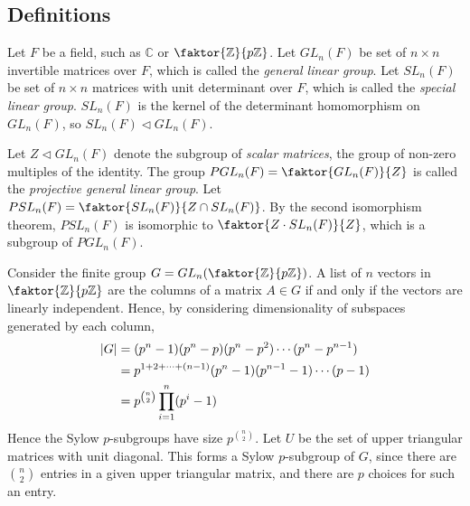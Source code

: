 \subsection{Definitions}
\begin{definition}
	Let \( F \) be a field, such as \( \mathbb C \) or \( \faktor{\mathbb Z}{p \mathbb Z} \).
	Let \( GL_n(F) \) be set of \( n \times n \) invertible matrices over \( F \), which is called the \textit{general linear group}.
	Let \( SL_n(F) \) be set of \( n \times n \) matrices with unit determinant over \( F \), which is called the \textit{special linear group}.
	\( SL_n(F) \) is the kernel of the determinant homomorphism on \( GL_n(F) \), so \( SL_n(F) \triangleleft GL_n(F) \).

	Let \( Z \triangleleft GL_n(F) \) denote the subgroup of \textit{scalar matrices}, the group of non-zero multiples of the identity.
	The group \( PGL_n(F) = \faktor{GL_n(F)}{Z} \) is called the \textit{projective general linear group}.
	Let \( PSL_n(F) = \faktor{SL_n(F)}{Z \cap SL_n(F)} \).
	By the second isomorphism theorem, \( PSL_n(F) \) is isomorphic to \( \faktor{Z \cdot SL_n(F)}{Z} \), which is a subgroup of \( PGL_n(F) \).
\end{definition}
\begin{example}
	Consider the finite group \( G = GL_n\qty(\faktor{\mathbb Z}{p\mathbb Z}) \).
	A list of \( n \) vectors in \( \faktor{\mathbb Z}{p\mathbb Z} \) are the columns of a matrix \( A \in G \) if and only if the vectors are linearly independent.
	Hence, by considering dimensionality of subspaces generated by each column,
	\begin{align*}
		\abs{G} &= (p^n - 1)(p^n - p)(p^n - p^2) \cdots (p^n - p^{n-1}) \\
		&= p^{1+2+\dots+(n-1)} (p^n - 1)(p^{n-1} - 1) \cdots (p - 1) \\
		&= p^{\binom{n}{2}} \prod_{i=1}^n (p^i - 1)
	\end{align*}
	Hence the Sylow \( p \)-subgroups have size \( p^{\binom{n}{2}} \).
	Let \( U \) be the set of upper triangular matrices with unit diagonal.
	This forms a Sylow \( p \)-subgroup of \( G \), since there are \( \binom{n}{2} \) entries in a given upper triangular matrix, and there are \( p \) choices for such an entry.
\end{example}

